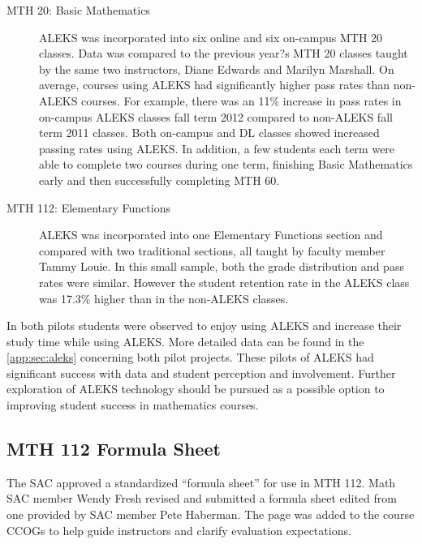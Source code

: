 \begin{description}
\item[MTH 20: Basic Mathematics] ALEKS was incorporated into six online and six on-campus MTH 20 classes.  Data was compared to the previous year?s MTH 20 classes taught by the same two instructors, Diane Edwards and Marilyn Marshall.  On average, courses using ALEKS had significantly higher pass rates than non-ALEKS courses.  For example, there was an 11\% increase in pass rates in on-campus ALEKS classes fall term 2012 compared to non-ALEKS fall term 2011 classes.  Both on-campus and DL classes showed increased passing rates using ALEKS.  In addition, a few students each term were able to complete two courses during one term, finishing Basic Mathematics early and then successfully completing MTH 60.

\item[MTH 112: Elementary Functions] ALEKS was incorporated into one Elementary Functions section and compared with two traditional sections, all taught by faculty member Tammy Louie.  In this small sample, both the grade distribution and pass rates were similar.  However the student retention rate in the ALEKS class was 17.3\% higher than in the non-ALEKS classes.  
 
 \end{description}
 
In both pilots students were observed to enjoy using ALEKS and increase their study time while using ALEKS.  More detailed data can be found in the \vref{app:sec:aleks} concerning both pilot projects. These pilots of ALEKS had significant success with data and student perception and involvement.  Further exploration of ALEKS technology should be pursued as a possible option to improving student success in mathematics courses.
 
\subsection{MTH 112 Formula Sheet}
The SAC approved a standardized ``formula sheet'' for use in MTH 112.  Math SAC member Wendy Fresh revised and submitted a formula sheet edited from one provided by SAC member Pete Haberman.  The page was added to the course CCOGs to help guide instructors and clarify evaluation expectations.
 
